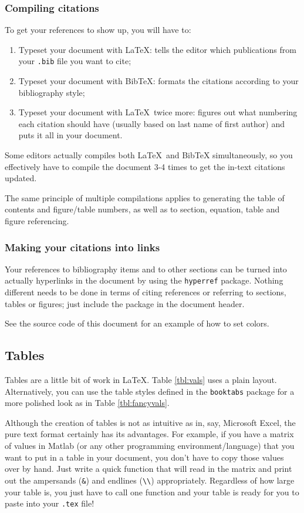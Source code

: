 \documentclass[12pt]{article}
\begin{document}
\subsubsection{Compiling citations}
To get your references to show up, you will have to:
\begin{enumerate}
	\item Typeset your document with \LaTeX: tells the editor which publications from your \texttt{.bib} file you want to cite;
	\item Typeset your document with BibTeX: formats the citations according to your bibliography style;
	\item Typeset your document with \LaTeX\ twice more: figures out what numbering each citation should have (usually based on last name of first author) and puts it all in your document.
\end{enumerate}

Some editors actually compiles both \LaTeX\ and BibTeX simultaneously, so you effectively have to compile the document 3-4 times to get the in-text citations updated.

The same principle of multiple compilations applies to generating the table of contents and figure/table numbers, as well as to section, equation, table and figure referencing.

\subsubsection{Making your citations into links}
Your references to bibliography items and to other sections can be turned into actually hyperlinks in the document by using the \verb!hyperref! package. Nothing different needs to be done in terms of citing references or referring to sections, tables or figures; just include the package in the document header.

See the source code of this document for an example of how to set colors.

\subsection{Tables}
Tables are a little bit of work in \LaTeX. Table \ref{tbl:vals} uses a plain layout. Alternatively, you can use the table styles defined in the \verb!booktabs! package for a more polished look as in Table \ref{tbl:fancyvals}.

Although the creation of tables is not as intuitive as in, say, Microsoft Excel, the pure text format certainly has its advantages. For example, if you have a matrix of values in Matlab (or any other programming environment/language) that you want to put in a table in your document, you don't have to copy those values over by hand. Just write a quick function that will read in the matrix and print out the ampersands (\verb!&!) and endlines (\verb!\\!) appropriately. Regardless of how large your table is, you just have to call one function and your table is ready for you to paste into your \verb!.tex! file!
\end{document}
